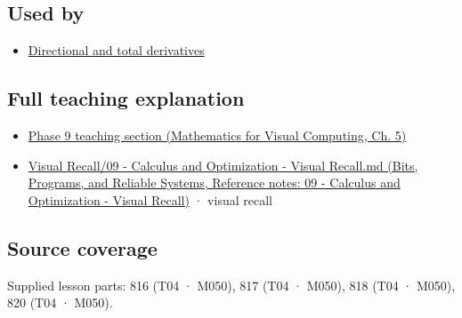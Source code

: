 \subsection{Used by}\label{appendix-677b59746ae0-used-by}

\begin{itemize}
\tightlist
\item
  \hyperref[appendix-e2d476574aab]{Directional and total derivatives}
\end{itemize}

\subsection{Full teaching explanation}\label{appendix-677b59746ae0-full-teaching-explanation}

\begin{itemize}
\tightlist
\item
  \href{../02-Mathematics-for-Visual-Computing/main.pdf\#nameddest=02-foundations-ii-ch021-multivariable-derivatives-and-sensitivity-1}{Phase 9 teaching section (Mathematics for Visual Computing, Ch. 5)}
\item
  \href{../01-Bits-Programs-and-Reliable-Systems/main.pdf\#nameddest=appendix-adf48f5dc5c1}{Visual Recall/09 - Calculus and Optimization - Visual Recall.md (Bits, Programs, and Reliable Systems, Reference notes: 09 - Calculus and Optimization - Visual Recall)} · visual recall
\end{itemize}

\subsection{Source coverage}\label{appendix-677b59746ae0-source-coverage}

Supplied lesson parts: 816 (T04 · M050), 817 (T04 · M050), 818 (T04 · M050), 820 (T04 · M050).
